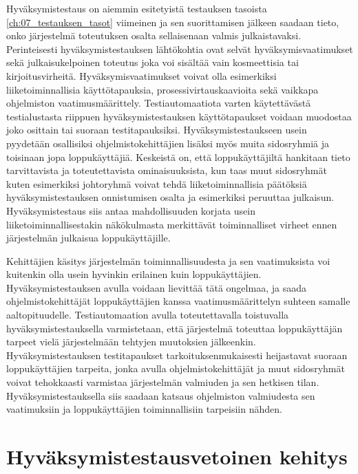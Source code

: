   Hyväksymistestaus on aiemmin esitetyistä testauksen tasoista \ref{ch:07_testauksen_tasot} viimeinen ja sen suorittamisen jälkeen saadaan tieto, onko järjestelmä toteutuksen osalta sellaisenaan valmis julkaistavaksi.
  Perinteisesti hyväksymistestauksen lähtökohtia ovat selvät hyväksymisvaatimukset sekä julkaisukelpoinen toteutus joka voi sisältää vain kosmeettisia tai kirjoitusvirheitä.
  Hyväksymisvaatimukset voivat olla esimerkiksi liiketoiminnallisia käyttötapauksia, prosessivirtauskaavioita sekä vaikkapa ohjelmiston vaatimusmäärittely.
  Testiautomaatiota varten käytettävästä testialustasta riippuen hyväksymistestauksen käyttötapaukset voidaan muodostaa joko osittain tai suoraan testitapauksiksi.
  Hyväksymistestaukseen usein pyydetään osallisiksi ohjelmistokehittäjien lisäksi myös muita sidosryhmiä ja toisinaan jopa loppukäyttäjiä.
  Keskeistä on, että loppukäyttäjiltä hankitaan tieto tarvittavista ja toteutettavista ominaisuuksista, kun taas muut sidosryhmät kuten esimerkiksi johtoryhmä voivat tehdä liiketoiminnallisia päätöksiä hyväksymistestauksen onnistumisen osalta ja esimerkiksi peruuttaa julkaisun.
  Hyväksymistestaus siis antaa mahdollisuuden korjata usein liiketoiminnallisestakin näkökulmasta merkittävät toiminnalliset virheet ennen järjestelmän julkaisua loppukäyttäjille.

  Kehittäjien käsitys järjestelmän toiminnallisuudesta ja sen vaatimuksista voi kuitenkin olla usein hyvinkin erilainen kuin loppukäyttäjien.
  Hyväksymistestauksen avulla voidaan lievittää tätä ongelmaa, ja saada ohjelmistokehittäjät loppukäyttäjien kanssa vaatimusmäärittelyn suhteen samalle aaltopituudelle.
  Testiautomaation avulla toteutettavalla toistuvalla hyväksymistestauksella varmistetaan, että järjestelmä toteuttaa loppukäyttäjän tarpeet vielä järjestelmään tehtyjen muutoksien jälkeenkin.
  Hyväksymistestauksen testitapaukset tarkoituksenmukaisesti heijastavat suoraan loppukäyttäjien tarpeita, jonka avulla ohjelmistokehittäjät ja muut sidosryhmät voivat tehokkaasti varmistaa järjestelmän valmiuden ja sen hetkisen tilan.
  Hyväksymistestauksella siis saadaan katsaus ohjelmiston valmiudesta sen vaatimuksiin ja loppukäyttäjien toiminnallisiin tarpeisiin nähden.

\section{Hyväksymistestausvetoinen kehitys} \label{ch:08_hyvaksymistestausvetoinen_kehitys}

